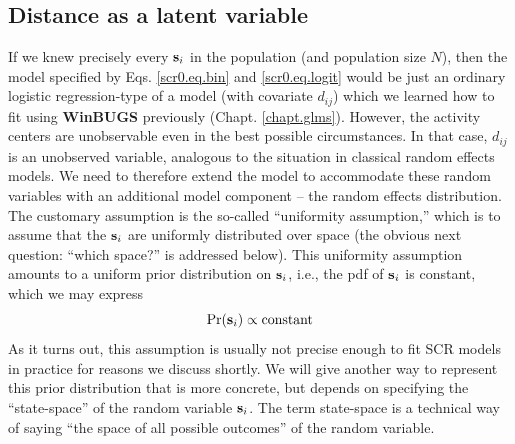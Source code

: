 \subsection{Distance as a latent variable}

If we knew precisely every ${\bf s}_{i}$ in the population (and
population size $N$), then the model specified by
Eqs. \ref{scr0.eq.bin} and \ref{scr0.eq.logit} would be just an
ordinary logistic regression-type of a model (with covariate $d_{ij}$)
which we learned how to fit using {\bf WinBUGS} previously
(Chapt. \ref{chapt.glms}).  However, the activity centers are
unobservable even in the best possible circumstances. In that case,
$d_{ij}$ is an unobserved variable, analogous to the situation in
classical random effects models.  We need to therefore extend the
model to accommodate these random variables with an additional model
component -- the random effects distribution.  The customary
assumption is the so-called ``uniformity assumption,'' which is to
assume that the ${\bf s}_{i}$ are uniformly distributed over space
(the obvious next question: ``which space?'' is addressed below).  This
uniformity assumption amounts to a uniform prior distribution on ${\bf
  s}_{i}$, i.e., the pdf of ${\bf s}_{i}$ is constant, which we may
express
\begin{equation}
	\Pr({\bf s}_{i}) \propto \mbox{constant}
\label{scr0.eq.sprior}
\end{equation}
 As it turns out, this assumption is usually not precise
enough to fit SCR models in practice for reasons we discuss
shortly.  We will give another way to represent this prior
distribution that is more concrete, but depends on specifying the
``state-space'' of the random variable ${\bf s}_{i}$. The term
state-space is a technical way of saying ``the space of all possible
outcomes'' of the random variable.

